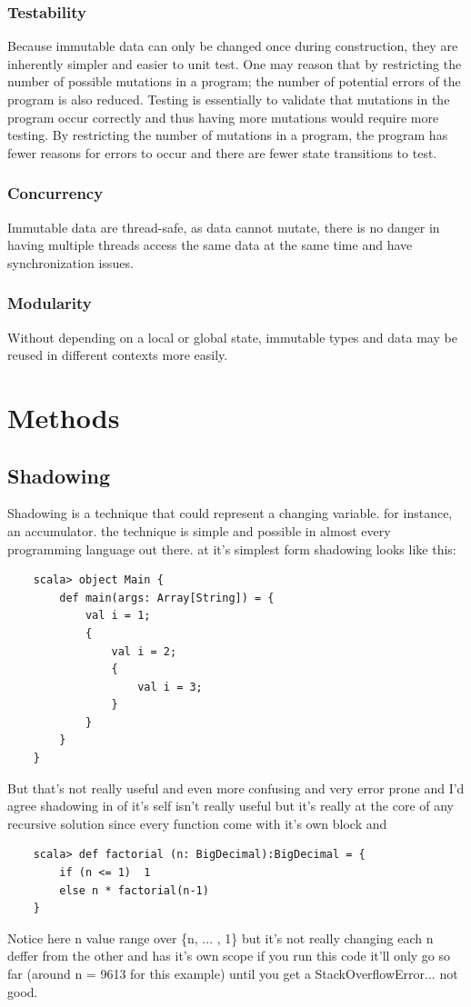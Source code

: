 \documentclass[12pt,twoside]{article}
\begin{document}
\subsubsection{Testability} Because immutable data can only be changed once during construction, they are inherently
simpler and easier to unit test. One may reason that by restricting the number of possible mutations
in a program; the number of potential errors of the program is also reduced. Testing is essentially
to validate that mutations in the program occur correctly and thus having more mutations would require more testing. By restricting the number of mutations in a program, the program has
fewer reasons for errors to occur and there are fewer state transitions to test.

\subsubsection{Concurrency} Immutable data are thread-safe, as data cannot mutate, there is no danger in having
multiple threads access the same data at the same time and have synchronization issues.

\subsubsection{Modularity} Without depending on a local or global state, immutable types and data may be reused
in different contexts more easily.

\newpage
\section{Methods}

\subsection{Shadowing}

Shadowing is a technique that could represent a changing variable. for instance, an accumulator. the technique is simple and possible in almost every programming language out there.
at it's simplest form shadowing looks like this:
\begin{lstlisting}
    scala> object Main {
        def main(args: Array[String]) = {
            val i = 1;
            {
                val i = 2;
                {
                    val i = 3;
                }
            }
        }  
    }    
\end{lstlisting}
But that's not really useful and even more confusing and very error prone and I'd agree shadowing in of it's self isn't really useful but it's really at the core of any recursive solution since every function come with it's own block and 
\begin{lstlisting} 
    scala> def factorial (n: BigDecimal):BigDecimal = {
        if (n <= 1)  1
        else n * factorial(n-1)
    }
\end{lstlisting}
Notice here n value range over \{n, ... , 1\} but it's not really changing each n deffer from the other and has it's own scope
if you run this code it'll only go so far (around  n = 9613 for this example) until you get a StackOverflowError... not good.
\end{document}
